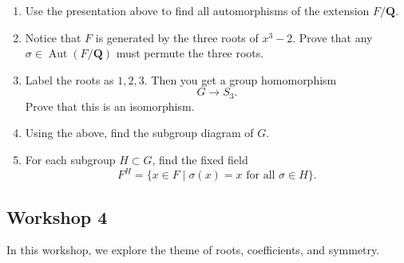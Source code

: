 \documentclass[11pt]{article}
\begin{document}
\begin{enumerate}
\item Use the presentation above to find all automorphisms of the extension \(F/\mathbf{Q}\).

\item Notice that \(F\) is generated by the three roots of \(x^3-2\).
Prove that any \(\sigma \in \operatorname{Aut}(F/\mathbf{Q})\) must permute the three roots.

\item Label the roots as \(1, 2, 3\).
Then you get a group homomorphism
\[ G  \to S_3.\]
Prove that this is an isomorphism.

\item Using the above, find the subgroup diagram of \(G\).

\item For each subgroup \(H \subset G\), find the fixed field
\[ F^H = \{x \in F \mid \sigma (x) = x \text{ for all } \sigma \in H\}.\]
\end{enumerate}
\subsection{Workshop 4}
\label{sec:orgfc2c8b9}
In this workshop, we explore the theme of roots, coefficients, and symmetry.
\end{document}

